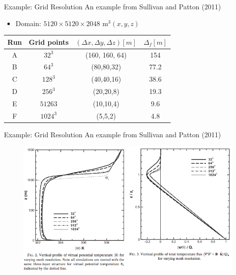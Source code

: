 \begin{frame}{Example: Grid Resolution}
An example from Sullivan and Patton (2011)
\begin{itemize}
	\item Domain: $5120 \times 5120 \times 2048$ m$^3 (x,y,z)$ 
\end{itemize}
\begin{center}
  \begin{tabular}{ c | c | c | c}\hline\hline
    \textbf{Run} & \textbf{Grid points} & $(\Delta x, \Delta y, \Delta z) [m]$ & $\Delta_f [m]$\\ \hline\hline
    A & $32^3$ & (160, 160, 64) & 154 \\
    B & $64^3$ & (80,80,32) & 77.2 \\
    C & $128^3$ & (40,40,16) & 38.6 \\
    D & $256^3$ & (20,20,8) & 19.3\\
    E & $51263$ & (10,10,4) & 9.6 \\
    F & $1024^3$ & (5,5,2) & 4.8 \\
    \hline\hline
  \end{tabular}
\end{center}
\end{frame}
\begin{frame}{Example: Grid Resolution}
An example from Sullivan and Patton (2011) 
\begin{figure}
\includegraphics[width=1\textwidth]{compare18}
\end{figure}
\end{frame}
